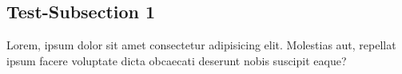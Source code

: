\subsection{Test-Subsection 1} \label{subsec:TestSubsection1}
    Lorem, ipsum dolor sit amet consectetur adipisicing elit. Molestias aut, repellat ipsum facere voluptate dicta obcaecati deserunt nobis suscipit eaque?

    
